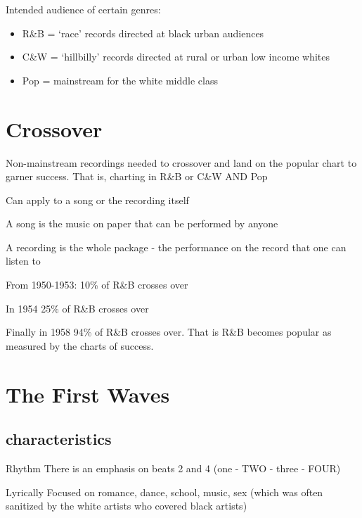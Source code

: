 \documentclass[12pt, a4paper, twoside, openright, titlepage]{book}
\begin{document}
\begin{rec}{}{}
    Intended audience of certain genres: \begin{itemize}
        \item R\&B = `race' records directed at black urban audiences
        \item C\&W = `hillbilly' records directed at rural or urban low income whites
        \item Pop = mainstream for the white middle class
    \end{itemize}
\end{rec}


\section{Crossover}

Non-mainstream recordings needed to crossover and land on the popular chart to garner success. That is, charting in R\&B or C\&W AND Pop


Can apply to a song or the recording itself

\begin{rec}{}{}
    A song is the music on paper that can be performed by anyone
\end{rec}

\begin{rec}{}{}
    A recording is the whole package - the performance on the record that one can listen to
\end{rec}

From 1950-1953: 10\% of R\&B crosses over


In 1954 25\% of R\&B crosses over

Finally in 1958 94\% of R\&B crosses over. That is R\&B becomes popular as measured by the charts of success.


\section{The First Waves}

\subsection{characteristics}

\begin{rmk}{Rhythm}{}
    There is an emphasis on beats 2 and 4 (one - TWO - three - FOUR)
\end{rmk}

\begin{rmk}{Lyrically}{}
    Focused on romance, dance, school, music, sex (which was often sanitized by the white artists who covered black artists)
\end{rmk}
\end{document}
